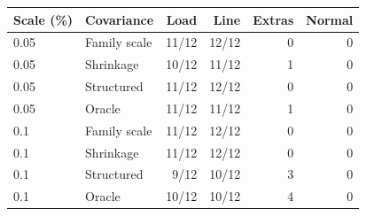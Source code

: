 \begin{tabular}{@{}llrrrr@{}}\toprule
Scale (\%) & Covariance & Load & Line & Extras & Normal\\\midrule
0.05 & Family scale & 11/12 & 12/12 & 0 & 0 \\
0.05 & Shrinkage & 10/12 & 11/12 & 1 & 0 \\
0.05 & Structured & 11/12 & 12/12 & 0 & 0 \\
0.05 & Oracle & 11/12 & 11/12 & 1 & 0 \\
0.1 & Family scale & 11/12 & 12/12 & 0 & 0 \\
0.1 & Shrinkage & 11/12 & 12/12 & 0 & 0 \\
0.1 & Structured & 9/12 & 10/12 & 3 & 0 \\
0.1 & Oracle & 10/12 & 10/12 & 4 & 0 \\
\bottomrule
\end{tabular}

